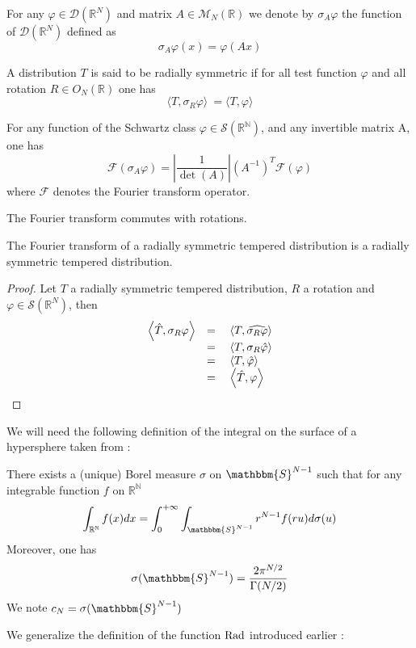 \documentclass[11pt,a4paper]{article}
\begin{document}
\begin{Def} For any $\varphi\in \mathcal{D}(\mathbb{R}^N)$ and matrix $A \in \mathcal{M}_N(\mathbb{R})$ we denote by $\sigma_A\varphi$ the function of $\mathcal{D}(\mathbb{R}^N)$ defined as \[\sigma_A\varphi(x) = \varphi(Ax)\]
\end{Def}
\begin{Def} A distribution $T$ is said to be radially symmetric if for all test function $\varphi$ and all rotation $R \in O_N(\mathbb{R})$ one has \[\langle
T,\sigma_R\varphi\rangle\ = \langle T, \varphi\rangle\]  
\end{Def}
\begin{Prop} For any function of the Schwartz class $\varphi \in \mathcal{S}(\mathbb{R^N})$, and any invertible matrix A, one has \[\mathcal{F}(\sigma_A\varphi) = \left|\dfrac{1}{\det(A)}\right|\left(A^{-1}\right)^T\mathcal{F}(\varphi)\] where $\mathcal{F} $ denotes the Fourier transform operator.
\end{Prop}
\begin{Cor} The Fourier transform commutes with rotations. 
\end{Cor}


\begin{Prop} The Fourier transform of a radially symmetric tempered distribution is a radially symmetric tempered distribution. 
\end{Prop}
\begin{proof} Let $T$ a radially symmetric tempered distribution, $R$ a rotation and $\varphi \in \mathcal{S}(\mathbb{R}^N)$, then
\[\begin{array}{ll}
\left\langle \hat{T},\sigma_R\varphi\right\rangle &= \quad\left\langle T,\widehat{\sigma_R\varphi}\right\rangle\\
 &= \quad\left\langle T,\sigma_R\hat{\varphi}\right\rangle\\
 &= \quad\left\langle T,\hat{\varphi}\right\rangle\\
 &= \quad\left\langle \hat{T},\varphi\right\rangle
\end{array}\]
\end{proof}
We will need the following definition of the integral on the surface of a hypersphere taken from \cite[p.78]{MR1681462} : 
\begin{Prop} There exists a (unique) Borel measure $\sigma$ on $\mathbbm{S}^{N-1}$  such that for any integrable function $f$ on $\mathbb{R^N}$ \[\int_{\mathbb{R^N}}f(x)dx = \int_{0}^{+\infty} \int_{\mathbbm{S}^{N-1}}r^{N-1}f(ru)d\sigma(u)\]
Moreover, one has \[\sigma(\mathbbm{S}^{N-1}) = \frac{2\pi^{N/2}}{\Gamma(N/2)}\]
We note $c_N = \sigma(\mathbbm{S}^{N-1})$
\end{Prop}
We generalize the definition of the function $\textup{Rad}$ introduced earlier :
\end{document}
